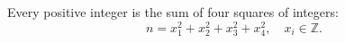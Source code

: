 Every positive integer is the sum of four squares of integers:
$$n = x_1^2 + x_2^2 + x_3^2 + x_4^2, \quad x_i \in \mathbb{Z}.$$

